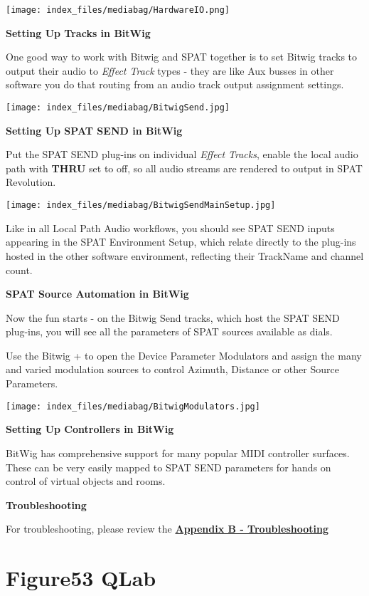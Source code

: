 \documentclass[
  letterpaper,
  DIV=11,
  numbers=noendperiod]{scrreport}
\begin{document}
\texttt{[image: index\_files/mediabag/HardwareIO.png]}

\textbf{Setting Up Tracks in BitWig}

One good way to work with Bitwig and SPAT together is to set Bitwig
tracks to output their audio to \emph{Effect Track} types - they are
like Aux busses in other software you do that routing from an audio
track output assignment settings.

\texttt{[image: index\_files/mediabag/BitwigSend.jpg]}

\textbf{Setting Up SPAT SEND in BitWig}

Put the SPAT SEND plug-ins on individual \emph{Effect Tracks}, enable
the local audio path with \textbf{THRU} set to off, so all audio streams
are rendered to output in SPAT Revolution.

\texttt{[image: index\_files/mediabag/BitwigSendMainSetup.jpg]}

Like in all Local Path Audio workflows, you should see SPAT SEND inputs
appearing in the SPAT Environment Setup, which relate directly to the
plug-ins hosted in the other software environment, reflecting their
TrackName and channel count.

\textbf{SPAT Source Automation in BitWig}

Now the fun starts - on the Bitwig Send tracks, which host the SPAT SEND
plug-ins, you will see all the parameters of SPAT sources available as
dials.

Use the Bitwig + to open the Device Parameter Modulators and assign the
many and varied modulation sources to control Azimuth, Distance or other
Source Parameters.

\texttt{[image: index\_files/mediabag/BitwigModulators.jpg]}

\textbf{Setting Up Controllers in BitWig}

BitWig has comprehensive support for many popular MIDI controller
surfaces. These can be very easily mapped to SPAT SEND parameters for
hands on control of virtual objects and rooms.

\textbf{Troubleshooting}

For troubleshooting, please review the
\textbf{\href{Appendix_B.md}{Appendix B - Troubleshooting}}

\hypertarget{figure53-qlab}{%
\chapter{Figure53 QLab}\label{figure53-qlab}}
\end{document}

